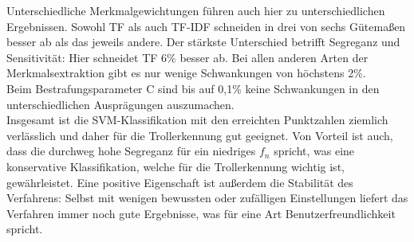 Unterschiedliche Merkmalgewichtungen führen auch hier zu unterschiedlichen Ergebnissen. Sowohl TF als auch TF-IDF schneiden in drei von sechs Gütemaßen besser ab als das jeweils andere. Der stärkste Unterschied betrifft Segreganz und Sensitivität: Hier schneidet TF 6\% besser ab. Bei allen anderen Arten der Merkmalsextraktion gibt es nur wenige Schwankungen von höchstens 2\%.\\
Beim Bestrafungsparameter C sind bis auf 0,1\% keine Schwankungen in den unterschiedlichen Ausprägungen auszumachen.\\
Insgesamt ist die SVM-Klassifikation mit den erreichten Punktzahlen ziemlich verlässlich und daher für die Trollerkennung gut geeignet. Von Vorteil ist auch, dass die durchweg hohe Segreganz für ein niedriges $f_n$ spricht, was eine konservative Klassifikation, welche für die Trollerkennung wichtig ist, gewährleistet. Eine positive Eigenschaft ist außerdem die Stabilität des Verfahrens: Selbst mit wenigen bewussten oder zufälligen Einstellungen liefert das Verfahren immer noch gute Ergebnisse, was für eine Art Benutzerfreundlichkeit spricht.
